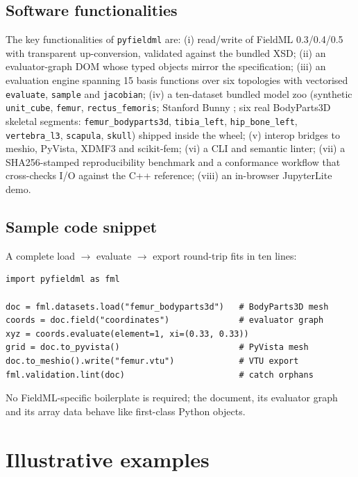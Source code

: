 \documentclass[preprint,12pt,a4paper]{elsarticle}
\begin{document}
\subsection{Software functionalities}

The key functionalities of \texttt{pyfieldml} are: (i) read/write of FieldML 0.3/0.4/0.5 with transparent up-conversion, validated against the bundled XSD; (ii) an evaluator-graph DOM whose typed objects mirror the specification; (iii) an evaluation engine spanning 15 basis functions over six topologies with vectorised \texttt{evaluate}, \texttt{sample} and \texttt{jacobian}; (iv) a ten-dataset bundled model zoo (synthetic \texttt{unit\_cube}, \texttt{femur}, \texttt{rectus\_femoris}; Stanford Bunny \cite{stanford_bunny}; six real BodyParts3D \cite{bodyparts3d} skeletal segments: \texttt{femur\_bodyparts3d}, \texttt{tibia\_left}, \texttt{hip\_bone\_left}, \texttt{vertebra\_l3}, \texttt{scapula}, \texttt{skull}) shipped inside the wheel; (v) interop bridges to meshio, PyVista, XDMF3 and scikit-fem; (vi) a CLI and semantic linter; (vii) a SHA256-stamped reproducibility benchmark and a conformance workflow that cross-checks I/O against the C++ reference; (viii) an in-browser JupyterLite demo.

\subsection{Sample code snippet}

A complete load $\rightarrow$ evaluate $\rightarrow$ export round-trip fits in ten lines:

\begin{lstlisting}[style=pystyle]
import pyfieldml as fml

doc = fml.datasets.load("femur_bodyparts3d")   # BodyParts3D mesh
coords = doc.field("coordinates")              # evaluator graph
xyz = coords.evaluate(element=1, xi=(0.33, 0.33))
grid = doc.to_pyvista()                        # PyVista mesh
doc.to_meshio().write("femur.vtu")             # VTU export
fml.validation.lint(doc)                       # catch orphans
\end{lstlisting}

No FieldML-specific boilerplate is required; the document, its evaluator graph and its array data behave like first-class Python objects.

\section{Illustrative examples}
\end{document}
